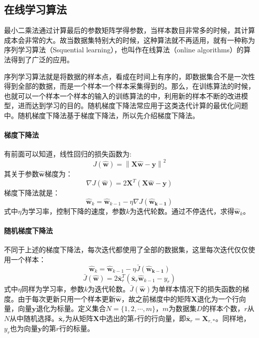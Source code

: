 \documentclass[12pt,a4paper,draft]{ctexart}
\begin{document}
\subsection{在线学习算法}
最小二乘法通过计算最后的参数矩阵学得参数，当样本数目非常多的时候，其计算成本会非常的大。故当数据集特别大的时候，这种算法就不再适用，就有一种称为序列学习算法（Ssquential learning），也叫作在线算法（online algorithms）的算法得到了广泛的应用。

序列学习算法就是将数据的样本点，看成在时间上有序的，即数据集合不是一次性得到全部的数据，而是一个样本一个样本采集得到的。那么，在训练算法的时候，也就可以一个样本一个样本的输入的训练算法的中，利用新的样本不断的改进模型，进而达到学习的目的。随机梯度下降法常应用于这类迭代计算的最优化问题中。随机梯度下降法基于梯度下降法，所以先介绍梯度下降法。

\paragraph{梯度下降法}
有前面可以知道，线性回归的损失函数为:
\[ J(\mathbf{\hat{w}})=\left \| \mathbf{X}\mathbf{\hat{w}}-\mathbf{y} \right \|^{2} \]
其关于参数$ \mathbf{\hat{w}} $梯度为：
\[ \nabla J(\mathbf{\hat{w}})=2\textbf{X}^T(\textbf{X}\hat{\textbf{w}}-\textbf{y}) \]
梯度下降法就是：
\[ \mathbf{\hat{w}}_{k} = \mathbf{\hat{w}}_{k-1}- \eta \nabla J(\mathbf{\hat{w}_{k-1}}) \]
式中$\eta$为学习率，控制下降的速度，参数$ k $为迭代轮数。通过不停迭代，求得$ \mathbf{\hat{w}}_{k} $。
\paragraph{随机梯度下降法}
不同于上述的梯度下降法，每次迭代都使用了全部的数据集，这里每次迭代仅仅使用一个样本：
\[\mathbf{\hat{w}}_{k} = \mathbf{\hat{w}}_{k-1}- \eta \bar{J}(\mathbf{\hat{w}_{k-1}})\]  
\[\bar{J}(\mathbf{\hat{w}})=2 \bar{\textbf{x}}_{r}^T(\bar{\textbf{x}}_{r}\mathbf{\hat{w}}_{k-1} - y_{r}) \] 
式中$\eta$同样为学习率，参数$ k $为迭代轮数。$ \bar{J}(\mathbf{\hat{w}}) $为单样本情况下的损失函数的梯度。由于每次更新只用一个样本更新$ \mathbf{\hat{w}} $，故之前梯度中的矩阵$ \textbf{X} $退化为一个行向量，向量$ \textbf{y} $退化为标量。定义集合$ N=\{1,2,\cdots,m\} $，$ m $为数据集$ D $的样本个数，$ r $从$ N $从中随机选择。$ \bar{\textbf{x}}_{r} $为从矩阵$ \textbf{X} $中选出的第$ r $行的行向量，即$ \bar{\textbf{x}}_{r}=\textbf{X}_{r,*} $。同样地，$ y_{r} $也为向量$ \textbf{y} $的第$ r $行的标量。
\end{document}
